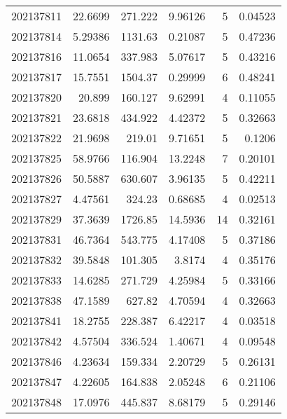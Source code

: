 \begin{tabular}{rrrrrr}
 202137811 &         22.6699  &      271.222  &            9.96126 &           5 & 0.04523 \\
 202137814 &          5.29386 &     1131.63   &            0.21087 &           5 & 0.47236 \\
 202137816 &         11.0654  &      337.983  &            5.07617 &           5 & 0.43216 \\
 202137817 &         15.7551  &     1504.37   &            0.29999 &           6 & 0.48241 \\
 202137820 &         20.899   &      160.127  &            9.62991 &           4 & 0.11055 \\
 202137821 &         23.6818  &      434.922  &            4.42372 &           5 & 0.32663 \\
 202137822 &         21.9698  &      219.01   &            9.71651 &           5 & 0.1206  \\
 202137825 &         58.9766  &      116.904  &           13.2248  &           7 & 0.20101 \\
 202137826 &         50.5887  &      630.607  &            3.96135 &           5 & 0.42211 \\
 202137827 &          4.47561 &      324.23   &            0.68685 &           4 & 0.02513 \\
 202137829 &         37.3639  &     1726.85   &           14.5936  &          14 & 0.32161 \\
 202137831 &         46.7364  &      543.775  &            4.17408 &           5 & 0.37186 \\
 202137832 &         39.5848  &      101.305  &            3.8174  &           4 & 0.35176 \\
 202137833 &         14.6285  &      271.729  &            4.25984 &           5 & 0.33166 \\
 202137838 &         47.1589  &      627.82   &            4.70594 &           4 & 0.32663 \\
 202137841 &         18.2755  &      228.387  &            6.42217 &           4 & 0.03518 \\
 202137842 &          4.57504 &      336.524  &            1.40671 &           4 & 0.09548 \\
 202137846 &          4.23634 &      159.334  &            2.20729 &           5 & 0.26131 \\
 202137847 &          4.22605 &      164.838  &            2.05248 &           6 & 0.21106 \\
 202137848 &         17.0976  &      445.837  &            8.68179 &           5 & 0.29146 \\

\end{tabular}
